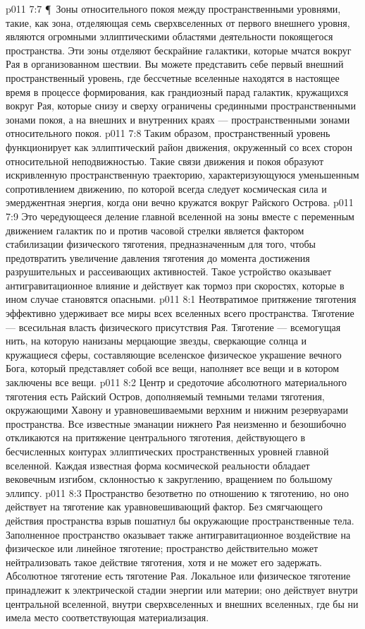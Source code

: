\vs p011 7:7 \P\ Зоны относительного покоя между пространственными уровнями, такие, как зона, отделяющая семь сверхвселенных от первого внешнего уровня, являются огромными эллиптическими областями деятельности покоящегося пространства. Эти зоны отделяют бескрайние галактики, которые мчатся вокруг Рая в организованном шествии. Вы можете представить себе первый внешний пространственный уровень, где бессчетные вселенные находятся в настоящее время в процессе формирования, как грандиозный парад галактик, кружащихся вокруг Рая, которые снизу и сверху ограничены срединными пространственными зонами покоя, а на внешних и внутренних краях --- пространственными зонами относительного покоя.
\vs p011 7:8 Таким образом, пространственный уровень функционирует как эллиптический район движения, окруженный со всех сторон относительной неподвижностью. Такие связи движения и покоя образуют искривленную пространственную траекторию, характеризующуюся уменьшенным сопротивлением движению, по которой всегда следует космическая сила и эмерджентная энергия, когда они вечно кружатся вокруг Райского Острова.
\vs p011 7:9 Это чередующееся деление главной вселенной на зоны вместе с переменным движением галактик по и против часовой стрелки является фактором стабилизации физического тяготения, предназначенным для того, чтобы предотвратить увеличение давления тяготения до момента достижения разрушительных и рассеивающих активностей. Такое устройство оказывает антигравитационное влияние и действует как тормоз при скоростях, которые в ином случае становятся опасными.
\vs p011 8:1 Неотвратимое притяжение тяготения эффективно удерживает все миры всех вселенных всего пространства. Тяготение --- всесильная власть физического присутствия Рая. Тяготение --- всемогущая нить, на которую нанизаны мерцающие звезды, сверкающие солнца и кружащиеся сферы, составляющие вселенское физическое украшение вечного Бога, который представляет собой все вещи, наполняет все вещи и в котором заключены все вещи.
\vs p011 8:2 Центр и средоточие абсолютного материального тяготения есть Райский Остров, дополняемый темными телами тяготения, окружающими Хавону и уравновешиваемыми верхним и нижним резервуарами пространства. Все известные эманации нижнего Рая неизменно и безошибочно откликаются на притяжение центрального тяготения, действующего в бесчисленных контурах эллиптических пространственных уровней главной вселенной. Каждая известная форма космической реальности обладает вековечным изгибом, склонностью к закруглению, вращением по большому эллипсу.
\vs p011 8:3 Пространство безответно по отношению к тяготению, но оно действует на тяготение как уравновешивающий фактор. Без смягчающего действия пространства взрыв пошатнул бы окружающие пространственные тела. Заполненное пространство оказывает также антигравитационное воздействие на физическое или линейное тяготение; пространство действительно может нейтрализовать такое действие тяготения, хотя и не может его задержать. Абсолютное тяготение есть тяготение Рая. Локальное или физическое тяготение принадлежит к электрической стадии энергии или материи; оно действует внутри центральной вселенной, внутри сверхвселенных и внешних вселенных, где бы ни имела место соответствующая материализация.
